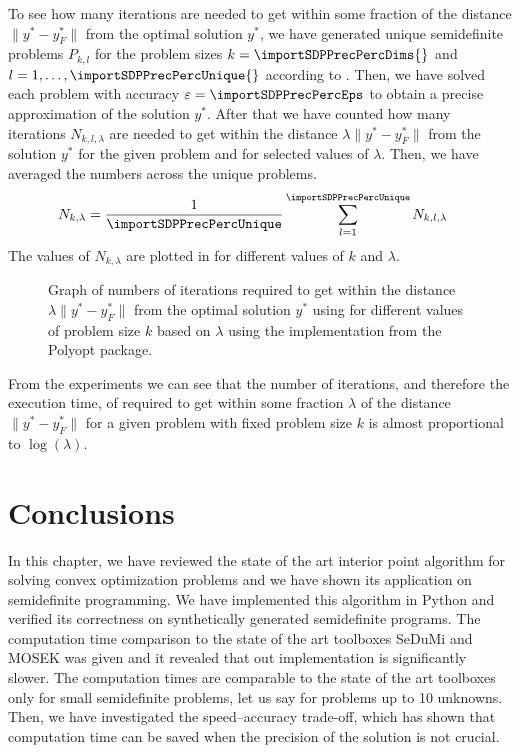 To see how many iterations are needed to get within some fraction of the distance $\|y^* - y_F^*\|$ from the optimal solution $y^*$, we have generated unique semidefinite problems $P_{k, l}$ for the problem sizes $k = \importSDPPrecPercDims{}$ and $l = 1, \ldots, \importSDPPrecPercUnique{}$ according to .
Then, we have solved each problem with accuracy $\varepsilon = \importSDPPrecPercEps$ to obtain a precise approximation of the solution $y^*$.
After that we have counted how many iterations $N_{k,l,\lambda}$ are needed to get within the distance $\lambda \|y^* - y_F^*\|$ from the solution $y^*$ for the given problem and for selected values of $\lambda$.
Then, we have averaged the numbers across the unique problems.
\begin{align}
  N_{k,\lambda} &= \frac{1}{\importSDPPrecPercUnique}\sum_{l=1}^{\importSDPPrecPercUnique}N_{k,l,\lambda}
\end{align}
The values of $N_{k,\lambda}$ are plotted in  for different values of $k$ and $\lambda$.

\begin{figure}[ht]
  \centering
  \resizebox{0.95\textwidth}{!}{}
  \caption{Graph of numbers of iterations required to get within the distance $\lambda \|y^* - y_F^*\|$ from the optimal solution $y^*$ using  for different values of problem size $k$ based on $\lambda$ using the implementation from the Polyopt package.}
\end{figure}

From the experiments we can see that the number of iterations, and therefore the execution time, of  required to get within some fraction $\lambda$ of the distance $\|y^* - y_F^*\|$ for a given problem with fixed problem size $k$ is almost proportional to $\log(\lambda)$.

\section{Conclusions}
In this chapter, we have reviewed the state of the art interior point algorithm for solving convex optimization problems and we have shown its application on semidefinite programming.
We have implemented this algorithm in Python and verified its correctness on synthetically generated semidefinite programs.
The computation time comparison to the state of the art toolboxes SeDuMi \cite{sedumi} and MOSEK \cite{mosek} was given and it revealed that out implementation is significantly slower.
The computation times are comparable to the state of the art toolboxes only for small semidefinite problems, let us say for problems up to 10 unknowns.
Then, we have investigated the speed--accuracy trade-off, which has shown that computation time can be saved when the precision of the solution is not crucial.
